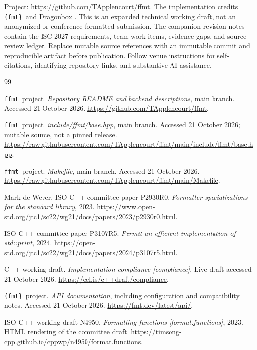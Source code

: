 \documentclass[11pt,letterpaper]{article}
\newcommand{\ffmt}{\texttt{ffmt}}
\newcommand{\fmtlib}{\texttt{\{fmt\}}}
\begin{document}
Project: \url{https://github.com/TApplencourt/ffmt}.
The implementation credits \fmtlib\ and Dragonbox \cite{ffmt-readme,dragonbox}.
This is an expanded technical working draft, not an anonymized or
conference-formatted submission. The companion revision notes contain the
ISC 2027 requirements, team work items, evidence gaps, and source-review
ledger. Replace mutable source references with an immutable commit and
reproducible artifact before publication. Follow venue instructions for
self-citations, identifying repository links, and substantive AI assistance.

\begin{thebibliography}{99}
\footnotesize
\setlength{\itemsep}{0.15em}
\setlength{\parskip}{0pt}

\ffmt\ project.
\emph{Repository README and backend descriptions}, main branch.
Accessed 21 October 2026.
\url{https://github.com/TApplencourt/ffmt}.

\ffmt\ project.
\emph{include/ffmt/base.hpp}, main branch.
Accessed 21 October 2026; mutable source, not a pinned release.
\url{https://raw.githubusercontent.com/TApplencourt/ffmt/main/include/ffmt/base.hpp}.

\ffmt\ project.
\emph{Makefile}, main branch. Accessed 21 October 2026.
\url{https://raw.githubusercontent.com/TApplencourt/ffmt/main/Makefile}.

Mark de Wever. ISO C++ committee paper P2930R0.
\emph{Formatter specializations for the standard library}, 2023.
\url{https://www.open-std.org/jtc1/sc22/wg21/docs/papers/2023/p2930r0.html}.

ISO C++ committee paper P3107R5.
\emph{Permit an efficient implementation of std::print}, 2024.
\url{https://open-std.org/jtc1/sc22/wg21/docs/papers/2024/p3107r5.html}.

C++ working draft.
\emph{Implementation compliance [compliance]}.
Live draft accessed 21 October 2026.
\url{https://eel.is/c++draft/compliance}.

\fmtlib\ project.
\emph{API documentation}, including configuration and compatibility notes.
Accessed 21 October 2026.
\url{https://fmt.dev/latest/api/}.

ISO C++ working draft N4950.
\emph{Formatting functions [format.functions]}, 2023.
HTML rendering of the committee draft.
\url{https://timsong-cpp.github.io/cppwp/n4950/format.functions}.


\end{thebibliography}
\end{document}
